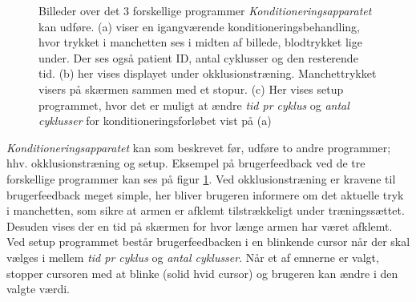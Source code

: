 \begin{figure}[H]
\centering
{}
\caption{Billeder over det 3 forskellige programmer \textit{Konditioneringsapparatet} kan udføre. (a) viser en igangværende konditioneringsbehandling, hvor trykket i manchetten ses i midten af billede, blodtrykket lige under. Der ses også patient ID, antal cyklusser og den resterende tid. (b) her vises displayet under okklusionstræning. Manchettrykket visers på skærmen sammen med et stopur. (c) Her vises setup programmet, hvor det er muligt at ændre \textit{tid pr cyklus} og \textit{antal cyklusser} for konditioneringsforløbet vist på (a)}\label{fig:interface}
\end{figure}

\textit{Konditioneringsapparatet} kan som beskrevet før, udføre to andre programmer; hhv. okklusionstræning og setup. Eksempel på brugerfeedback ved de tre forskellige programmer kan ses på figur \ref{fig:interface}. Ved okklusionstræning er kravene til brugerfeedback meget simple, her bliver brugeren informere om det aktuelle tryk i manchetten, som sikre at armen er afklemt tilstrækkeligt under træningssættet. Desuden vises der en tid på skærmen for hvor længe armen har været afklemt. Ved setup programmet består brugerfeedbacken i en blinkende cursor når der skal vælges i mellem \textit{tid pr cyklus} og \textit{antal cyklusser}. Når et af emnerne er valgt, stopper cursoren med at blinke (solid hvid cursor) og brugeren kan ændre i den valgte værdi.

